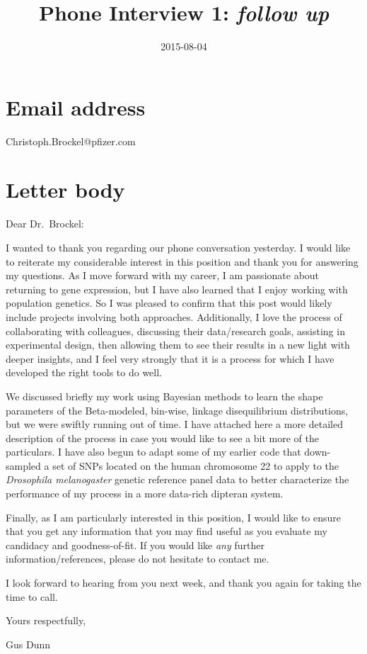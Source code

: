 \documentclass[letterpaper]{scrartcl}
\title{Phone Interview 1: \emph{follow up}}
\date{2015-08-04}
\begin{document}
\maketitle

{
\hypersetup{linkcolor=black}
\setcounter{tocdepth}{3}
\tableofcontents
}
\section{Email address}\label{email-address}

Christoph.Brockel@pfizer.com

\section{Letter body}\label{letter-body}

Dear Dr.~Brockel:

I wanted to thank you regarding our phone conversation yesterday. I
would like to reiterate my considerable interest in this position and
thank you for answering my questions. As I move forward with my career,
I am passionate about returning to gene expression, but I have also
learned that I enjoy working with population genetics. So I was pleased
to confirm that this post would likely include projects involving both
approaches. Additionally, I love the process of collaborating with
colleagues, discussing their data/research goals, assisting in
experimental design, then allowing them to see their results in a new
light with deeper insights, and I feel very strongly that it is a
process for which I have developed the right tools to do well.

We discussed briefly my work using Bayesian methods to learn the shape
parameters of the Beta-modeled, bin-wise, linkage disequilibrium
distributions, but we were swiftly running out of time. I have attached
here a more detailed description of the process in case you would like
to see a bit more of the particulars. I have also begun to adapt some of
my earlier code that down-sampled a set of SNPs located on the human
chromosome 22 to apply to the \emph{Drosophila melanogaster} genetic
reference panel data to better characterize the performance of my
process in a more data-rich dipteran system.

Finally, as I am particularly interested in this position, I would like
to ensure that you get any information that you may find useful as you
evaluate my candidacy and goodness-of-fit. If you would like \emph{any}
further information/references, please do not hesitate to contact me.

I look forward to hearing from you next week, and thank you again for
taking the time to call.

Yours respectfully,

Gus Dunn
\end{document}
